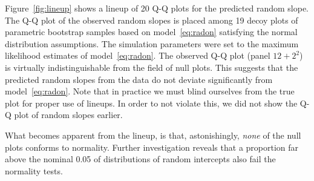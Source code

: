 \documentclass{article} %
\begin{document}
Figure~\ref{fig:lineup} shows a lineup \citep{buja:2009} of 20 Q-Q plots for the predicted random slope. The Q-Q plot of the observed random slopes is placed among 19 decoy plots of parametric bootstrap samples based on model~\eqref{eq:radon} satisfying the normal distribution assumptions. The simulation parameters were set to the maximum likelihood estimates of model~\eqref{eq:radon}.
The observed Q-Q plot (panel $12+2^2$) is virtually indistinguishable from the field of null plots. This suggests that the predicted random slopes  from the data do not deviate significantly from model~\eqref{eq:radon}. 
Note that in practice we must blind ourselves from the true plot for proper use of lineups. In order to not violate this, we did not show the Q-Q plot of random slopes earlier.
%
%

What becomes apparent from the lineup, is that, astonishingly, {\it none} of the null plots conforms to normality. Further investigation  reveals  that a  proportion far above the nominal 0.05 of distributions of random intercepts also fail the normality tests.


\end{document}
